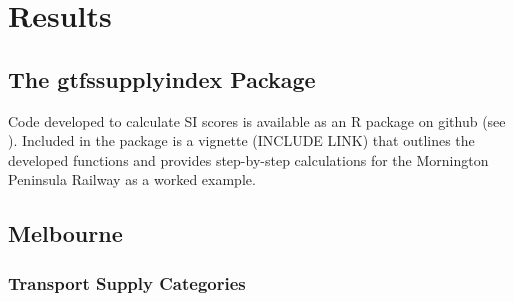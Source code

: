\documentclass[preprint, 3p,
authoryear]{elsarticle} %
\begin{document}
\hypertarget{results}{%
\section{Results}\label{results}}

\hypertarget{the-gtfssupplyindex-package}{%
\subsection{The gtfssupplyindex
Package}\label{the-gtfssupplyindex-package}}

Code developed to calculate SI scores is available as an R package on
github (see \citet{gtfssupplyindex_github}). Included in the package is
a vignette (INCLUDE LINK) that outlines the developed functions and
provides step-by-step calculations for the Mornington Peninsula Railway
as a worked example.

\hypertarget{melbourne}{%
\subsection{Melbourne}\label{melbourne}}

\hypertarget{transport-supply-categories}{%
\subsubsection{Transport Supply
Categories}\label{transport-supply-categories}}
\end{document}
